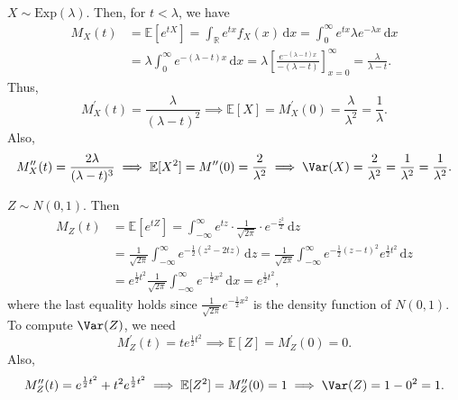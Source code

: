 \begin{eg}
    \(X \sim \mathrm{Exp}(\lambda ) \). Then, for \(t < \lambda\), we have 
    \begin{align*}
        M_X(t) &= \mathbb{E} [e^{tX}] = \int _{\mathbb{R} } e^{tx} f_X(x) \, \mathrm{d} x = \int _0^{\infty} e^{tx} \lambda e^{-\lambda x} \, \mathrm{d} x \\
        &= \lambda \int _0^{\infty} e^{-(\lambda - t) x} \, \mathrm{d} x = \lambda \left[ \frac{e^{-(\lambda - t) x}}{-(\lambda - t)} \right]_{x = 0}^{\infty} = \frac{\lambda }{\lambda - t}.    
    \end{align*} 
    Thus,
    \[
        M_X^{\prime} (t) = \frac{\lambda }{(\lambda - t)^2} \implies \mathbb{E} [X] = M_X^{\prime} (0) = \frac{\lambda }{\lambda ^2} = \frac{1}{\lambda }.
    \]
    Also,
    \[
        M_X^{\prime\prime} (t) = \frac{2 \lambda }{(\lambda - t)^3} \implies \mathbb{E} [X^2] = M^{\prime\prime} (0) = \frac{2}{\lambda ^2} \implies \Var(X) = \frac{2}{\lambda ^2} = \frac{1}{\lambda ^2} = \frac{1}{\lambda ^2}.
    \]

\end{eg}

\begin{eg}
    \(Z \sim N(0, 1)\). Then 
    \begin{align*}
        M_Z(t) &= \mathbb{E} \left[ e^{tZ} \right] = \int _{-\infty }^{\infty } e^{tz} \cdot \frac{1}{\sqrt{2 \pi } } \cdot e^{-\frac{z^2}{2}} \, \mathrm{d} z \\
        &= \frac{1}{\sqrt{2 \pi } } \int _{-\infty }^{\infty} e^{-\frac{1}{2} \left( z^2 - 2 t z \right) } \, \mathrm{d} z = \frac{1}{\sqrt{2 \pi } } \int _{-\infty }^{\infty } e^{-\frac{1}{2} \left( z - t \right)^2 } e^{\frac{1}{2} t^2} \, \mathrm{d} z \\
        &= e^{\frac{1}{2} t^2} \frac{1}{\sqrt{2 \pi } } \int _{-\infty }^{\infty } e^{- \frac{1}{2} x^2} \, \mathrm{d} x = e^{\frac{1}{2} t^2},   
    \end{align*} 
    where the last equality holds since \(\frac{1}{\sqrt{2 \pi } } e^{- \frac{1}{2} x^2}\) is the density function of \(N(0, 1)\). To compute \(\Var(Z)\), we need 
    \[
      M_Z^{\prime} (t) = t e^{\frac{1}{2} t^2} \implies \mathbb{E} [Z] = M_Z^{\prime} (0) = 0.  
    \]
    Also,
    \[
        M_Z^{\prime\prime} (t) = e^{\frac{1}{2} t^2} + t^2 e^{\frac{1}{2} t^2} \implies \mathbb{E} [Z^2] = M_Z^{\prime\prime} (0) = 1 \implies \Var(Z) = 1 - 0^2 = 1.
    \]
\end{eg}

